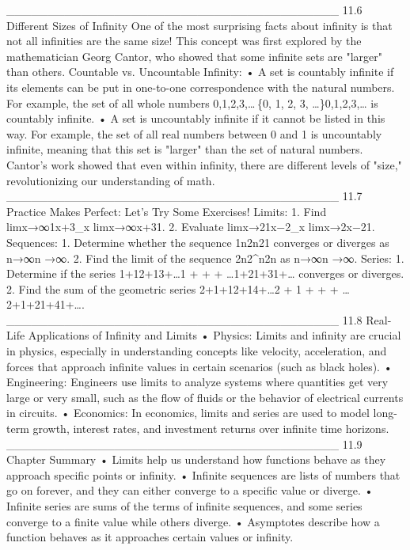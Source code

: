 ________________________________________
11.6 Different Sizes of Infinity
One of the most surprising facts about infinity is that not all infinities are the same size! This concept was first explored by the mathematician Georg Cantor, who showed that some infinite sets are "larger" than others.
Countable vs. Uncountable Infinity:
•	A set is countably infinite if its elements can be put in one-to-one correspondence with the natural numbers. For example, the set of all whole numbers {0,1,2,3,… }\{0, 1, 2, 3, \dots\}{0,1,2,3,…} is countably infinite.
•	A set is uncountably infinite if it cannot be listed in this way. For example, the set of all real numbers between 0 and 1 is uncountably infinite, meaning that this set is "larger" than the set of natural numbers.
Cantor’s work showed that even within infinity, there are different levels of "size," revolutionizing our understanding of math.
________________________________________
11.7 Practice Makes Perfect: Let’s Try Some Exercises!
Limits:
1.	Find lim⁡x→∞1x+3\lim_{x \to \infty} limx→∞x+31.
2.	Evaluate lim⁡x→21x−2\lim_{x } limx→2x−21.
Sequences:
1.	Determine whether the sequence 1n2n21 converges or diverges as n→∞n \to \inftyn→∞.
2.	Find the limit of the sequence 2n2^n2n as n→∞n \to \inftyn→∞.
Series:
1.	Determine if the series 1+12+13+…1 +  +  + \dots1+21+31+… converges or diverges.
2.	Find the sum of the geometric series 2+1+12+14+…2 + 1 +  +  + \dots2+1+21+41+….
________________________________________
11.8 Real-Life Applications of Infinity and Limits
•	Physics: Limits and infinity are crucial in physics, especially in understanding concepts like velocity, acceleration, and forces that approach infinite values in certain scenarios (such as black holes).
•	Engineering: Engineers use limits to analyze systems where quantities get very large or very small, such as the flow of fluids or the behavior of electrical currents in circuits.
•	Economics: In economics, limits and series are used to model long-term growth, interest rates, and investment returns over infinite time horizons.
________________________________________
11.9 Chapter Summary
•	Limits help us understand how functions behave as they approach specific points or infinity.
•	Infinite sequences are lists of numbers that go on forever, and they can either converge to a specific value or diverge.
•	Infinite series are sums of the terms of infinite sequences, and some series converge to a finite value while others diverge.
•	Asymptotes describe how a function behaves as it approaches certain values or infinity.
